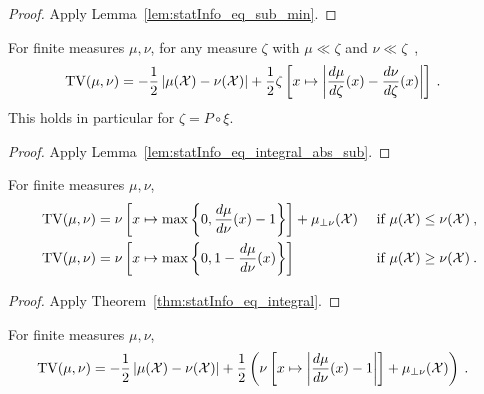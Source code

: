 \begin{proof}%
{}
Apply Lemma~\ref{lem:statInfo_eq_sub_min}.
\end{proof}


\begin{lemma}
  \label{lem:tv_eq_integral_abs_sub}
  For finite measures $\mu, \nu$, for any measure $\zeta$ with $\mu \ll \zeta$ and $\nu \ll \zeta$~,
  \begin{align*}
  \operatorname{TV}(\mu, \nu)
  &= - \frac{1}{2} \left\vert \mu(\mathcal X) - \nu(\mathcal X) \right\vert + 
  \frac{1}{2} \zeta\left[x \mapsto \left\vert \frac{d \mu}{d\zeta}(x) - \frac{d \nu}{d\zeta}(x)\right\vert\right] 
  \: .
  \end{align*}
  This holds in particular for $\zeta = P \circ \xi$.
\end{lemma}

\begin{proof}%
{}
Apply Lemma~\ref{lem:statInfo_eq_integral_abs_sub}.
\end{proof}


\begin{lemma}
  \label{lem:tv_eq_integral}
  For finite measures $\mu, \nu$,
  \begin{align*}
  \operatorname{TV}(\mu, \nu)
  &= \nu\left[ x \mapsto \max \left\{0 , \frac{d \mu}{d\nu}(x) - 1 \right\} \right] + \mu_{\perp \nu}(\mathcal X) & \text{ if } \mu(\mathcal X) \le \nu(\mathcal X)
  \: , \\
  \operatorname{TV}(\mu, \nu)
  &= \nu\left[ x \mapsto \max \left\{0 , 1 - \frac{d \mu}{d\nu}(x) \right\} \right] & \text{ if } \mu(\mathcal X) \ge \nu(\mathcal X)
  \: .
  \end{align*}
\end{lemma}

\begin{proof}%
{}
Apply Theorem~\ref{thm:statInfo_eq_integral}.
\end{proof}


\begin{lemma}
  \label{lem:tv_eq_integral_abs}
  For finite measures $\mu, \nu$,
  \begin{align*}
  \operatorname{TV}(\mu, \nu)
  &= -\frac{1}{2} \left\vert \mu(\mathcal X) - \nu(\mathcal X)\right\vert + \frac{1}{2}\left( \nu\left[ x \mapsto \left\vert \frac{d \mu}{d\nu}(x) - 1 \right\vert \right]  + \mu_{\perp \nu}(\mathcal X)\right)
  \: .
  \end{align*}
\end{lemma}

